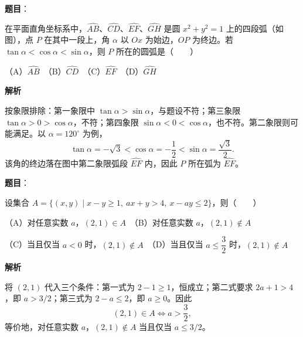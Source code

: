 \begin{answer}

\textbf{题目}：

在平面直角坐标系中，$\widehat{AB}$、$\widehat{CD}$、$\widehat{EF}$、$\widehat{GH}$ 是圆 $x^2+y^2=1$ 上的四段弧（如图），点 $P$ 在其中一段上，角 $\alpha$ 以 $Ox$ 为始边，$OP$ 为终边。若 $\tan\alpha<\cos\alpha<\sin\alpha$，则 $P$ 所在的圆弧是\mbox{（　　）}
\nopagebreak[4]
\begin{center}\end{center}
\nopagebreak[4]
（A）$\widehat{AB}$　（B）$\widehat{CD}$　（C）$\widehat{EF}$　（D）$\widehat{GH}$

\textbf{解析}

按象限排除：第一象限中 $\tan\alpha>\sin\alpha$，与题设不符；第三象限 $\tan\alpha>0>\cos\alpha$，不符；第四象限 $\sin\alpha<0<\cos\alpha$，也不符。第二象限则可能满足。以 $\alpha=120^\circ$ 为例，
\nopagebreak[4]
\[
\tan\alpha=-\sqrt3<\cos\alpha=-\frac12<\sin\alpha=\frac{\sqrt3}{2}.
\]
该角的终边落在图中第二象限弧段 $\widehat{EF}$ 内，因此 $P$ 所在弧为 $\widehat{EF}$。


\end{answer}
\begin{answer}

\textbf{题目}：

设集合 $A=\{(x,y)\mid x-y\ge1,\ ax+y>4,\ x-ay\le2\}$，则\mbox{（　　）}

（A）对任意实数 $a$，$(2,1)\in A$　（B）对任意实数 $a$，$(2,1)\notin A$

（C）当且仅当 $a<0$ 时，$(2,1)\notin A$　（D）当且仅当 $a\le\dfrac32$ 时，$(2,1)\notin A$

\textbf{解析}

将 $(2,1)$ 代入三个条件：第一式为 $2-1\ge1$，恒成立；第二式要求 $2a+1>4$，即 $a>3/2$；第三式为 $2-a\le2$，即 $a\ge0$。因此
\nopagebreak[4]
\[
(2,1)\in A\iff a>\frac32,
\]
等价地，对任意实数 $a$，$(2,1)\notin A$ 当且仅当 $a\le3/2$。


\end{answer}

